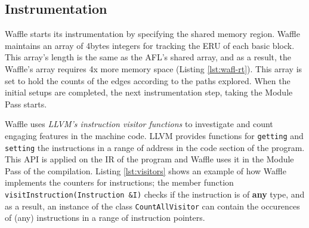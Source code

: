 \subsection{Instrumentation}
\label{subsec:inst}


Waffle starts its instrumentation by specifying the shared memory region. Waffle maintains an array of 4bytes integers for tracking the ERU of each basic block. This array's length is the same as the AFL's shared array, and as a result, the Waffle's array requires 4x more memory space (Listing \ref{lst:wafl-rt}). This array is set to hold the counts of the edges according to the paths explored. When the initial setups are completed, the next instrumentation step, taking the Module Pass starts.
  
  




Waffle uses \textit{LLVM's instruction visitor functions} \cite{inst_visitor} to investigate and count engaging features in the machine code. LLVM provides functions for \texttt{getting} and \texttt{setting} the instructions in a range of address in the code section of the program. This API is applied on the IR of the program and Waffle uses it in the Module Pass of the compilation. Listing \ref{lst:visitors} shows an example of how Waffle implements the counters for instructions; the member function \texttt{visitInstruction(Instruction \&I)} checks if the instruction is of \textbf{any} type, and as a result, an instance of the class \texttt{CountAllVisitor} can contain the occurences of (any) instructions in a range of instruction pointers.




